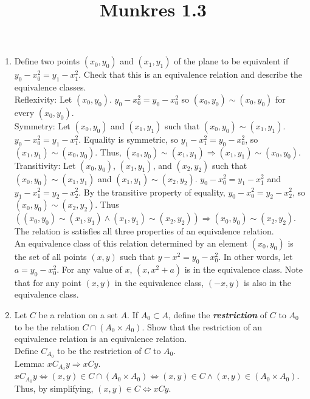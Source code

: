 \documentclass{article}
\title{Munkres 1.3}
\date{}
\begin{document}
\maketitle

\begin{enumerate}
      \item Define two points $(x_{0}, y_{0})$ and $(x_{1}, y_{1})$ of the plane to be equivalent if $y_{0} - x_{0}^{2} = y_{1} - x_{1}^{2}$. Check that this is an equivalence relation and describe the equivalence classes.\\
            Reflexivity: Let $(x_{0}, y_{0})$. $y_{0} - x_{0}^{2} = y_{0} - x_{0}^{2}$ so $(x_{0}, y_{0}) \sim (x_{0}, y_{0})$ for every $(x_{0}, y_{0})$.\\
            Symmetry: Let $(x_{0}, y_{0})$ and $(x_{1}, y_{1})$ such that $(x_{0}, y_{0}) \sim (x_{1}, y_{1})$. $y_{0} - x_{0}^{2} = y_{1} - x_{1}^{2}$. Equality is symmetric, so $y_{1} - x_{1}^{2} = y_{0} - x_{0}^{2}$, so $(x_{1}, y_{1}) \sim (x_{0}, y_{0})$. Thus, $(x_{0}, y_{0}) \sim (x_{1}, y_{1}) \Rightarrow (x_{1}, y_{1}) \sim (x_{0}, y_{0})$.\\
            Transitivity: Let $(x_{0}, y_{0})$, $(x_{1}, y_{1})$, and $(x_{2}, y_{2})$ such that $(x_{0}, y_{0}) \sim (x_{1}, y_{1})$ and $(x_{1}, y_{1}) \sim (x_{2}, y_{2})$. $y_{0} - x_{0}^{2} = y_{1} - x_{1}^{2}$ and $y_{1} - x_{1}^{2} = y_{2} - x_{2}^{2}$. By the transitive property of equality, $y_{0} - x_{0}^{2} = y_{2} - x_{2}^{2}$, so $(x_{0}, y_{0}) \sim (x_{2}, y_{2})$. Thus $((x_{0}, y_{0}) \sim (x_{1}, y_{1}) \land (x_{1}, y_{1}) \sim (x_{2}, y_{2})) \Rightarrow (x_{0}, y_{0}) \sim (x_{2}, y_{2})$.\\
            The relation is satisfies all three properties of an equivalence relation.\\

            An equivalence class of this relation determined by an element $(x_{0}, y_{0})$ is the set of all points $(x, y)$ such that $y-x^{2} = y_{0} - x_{0}^2$. In other words, let $a = y_{0} - x_{0}^2$. For any value of $x$, $(x, x^{2} + a)$ is in the equivalence class.
            Note that for any point $(x, y)$ in the equivalence class, $(-x, y)$ is also in the equivalence class.
      \item Let $C$ be a relation on a set $A$. If $A_{0} \subset A$, define the \textit{\textbf{restriction}} of $C$ to $A_{0}$ to be the relation $C \cap (A_{0} \times A_{0})$. Show that the restriction of an equivalence relation is an equivalence relation.\\
            Define $C_{A_{0}}$ to be the restriction of $C$ to $A_{0}$.\\
            Lemma: $xC_{A_{0}}y \Rightarrow xCy$.\\
            $xC_{A_{0}}y \iff (x, y) \in C \cap (A_{0} \times A_{0}) \iff (x, y) \in C \land (x, y) \in (A_{0} \times A_{0})$. Thus, by simplifying, $(x, y) \in C \iff xCy$.\\


\end{enumerate}
\end{document}
